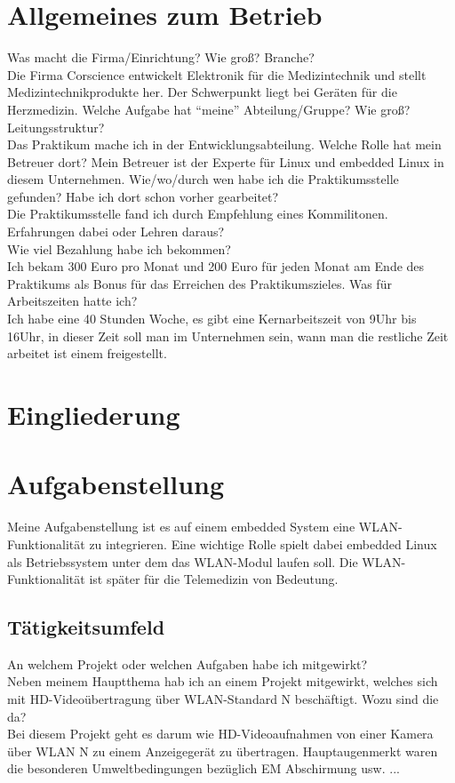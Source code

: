 \documentclass[pdftex,12pt,a4paper]{scrreprt}
\begin{document}

\tableofcontents

\begin{abstract}

\end{abstract}

\section{Allgemeines zum Betrieb}
Was macht die Firma/Einrichtung? Wie groß? Branche?\\
Die Firma Corscience entwickelt Elektronik für die Medizintechnik und stellt Medizintechnikprodukte her.
Der Schwerpunkt liegt bei Geräten für die Herzmedizin.
Welche Aufgabe hat "`meine"' Abteilung/Gruppe? Wie groß? Leitungsstruktur?\\
Das Praktikum mache ich in der Entwicklungsabteilung.
Welche Rolle hat mein Betreuer dort?
Mein Betreuer ist der Experte für Linux und embedded Linux in diesem Unternehmen.
Wie/wo/durch wen habe ich die Praktikumsstelle gefunden? Habe ich dort schon vorher gearbeitet?\\
Die Praktikumsstelle fand ich durch Empfehlung eines Kommilitonen.
Erfahrungen dabei oder Lehren daraus?\\
Wie viel Bezahlung habe ich bekommen?\\
Ich bekam 300 Euro pro Monat und 200 Euro für jeden Monat am Ende des Praktikums als Bonus für das Erreichen des Praktikumszieles.
Was für Arbeitszeiten hatte ich?\\
Ich habe eine 40 Stunden Woche, es gibt eine Kernarbeitszeit von 9Uhr bis 16Uhr, in dieser Zeit soll man im Unternehmen sein,
wann man die restliche Zeit arbeitet ist einem freigestellt.
\section{Eingliederung}
\section{Aufgabenstellung}
Meine Aufgabenstellung ist es auf einem embedded System eine WLAN-Funktionalität zu integrieren.
Eine wichtige Rolle spielt dabei embedded Linux als Betriebssystem unter dem das WLAN-Modul laufen soll.
Die WLAN-Funktionalität ist später für die Telemedizin von Bedeutung.
\subsection{Tätigkeitsumfeld}
An welchem Projekt oder welchen Aufgaben habe ich mitgewirkt?\\
Neben meinem Hauptthema hab ich an einem Projekt mitgewirkt, welches sich mit HD-Videoübertragung über WLAN-Standard N beschäftigt.
Wozu sind die da?\\
Bei diesem Projekt geht es darum wie HD-Videoaufnahmen von einer Kamera
über WLAN N zu einem Anzeigegerät zu übertragen. Hauptaugenmerkt waren
die besonderen Umweltbedingungen bezüglich EM Abschirmung usw. ...
\end{document}
